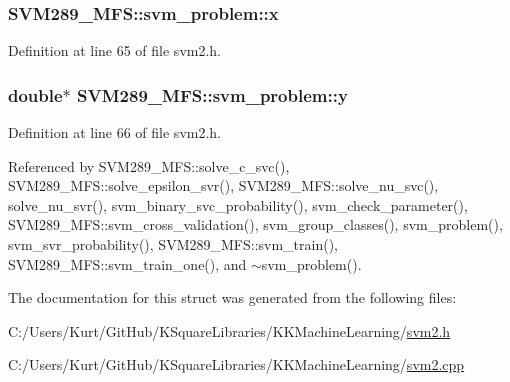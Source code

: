 \subsubsection[{\texorpdfstring{x}{x}}]{ S\+V\+M289\+\_\+\+M\+F\+S\+::svm\+\_\+problem\+::x}\hypertarget{struct_s_v_m289___m_f_s_1_1svm__problem_a7bca932b51ca89f6820225e8e9c1bd35}{}\label{struct_s_v_m289___m_f_s_1_1svm__problem_a7bca932b51ca89f6820225e8e9c1bd35}


Definition at line 65 of file svm2.\+h.

\subsubsection[{\texorpdfstring{y}{y}}]{\setlength{\rightskip}{0pt plus 5cm}double$\ast$ S\+V\+M289\+\_\+\+M\+F\+S\+::svm\+\_\+problem\+::y}\hypertarget{struct_s_v_m289___m_f_s_1_1svm__problem_a56cf75f3e15322e1928a8294f9a55d2a}{}\label{struct_s_v_m289___m_f_s_1_1svm__problem_a56cf75f3e15322e1928a8294f9a55d2a}


Definition at line 66 of file svm2.\+h.



Referenced by S\+V\+M289\+\_\+\+M\+F\+S\+::solve\+\_\+c\+\_\+svc(), S\+V\+M289\+\_\+\+M\+F\+S\+::solve\+\_\+epsilon\+\_\+svr(), S\+V\+M289\+\_\+\+M\+F\+S\+::solve\+\_\+nu\+\_\+svc(), solve\+\_\+nu\+\_\+svr(), svm\+\_\+binary\+\_\+svc\+\_\+probability(), svm\+\_\+check\+\_\+parameter(), S\+V\+M289\+\_\+\+M\+F\+S\+::svm\+\_\+cross\+\_\+validation(), svm\+\_\+group\+\_\+classes(), svm\+\_\+problem(), svm\+\_\+svr\+\_\+probability(), S\+V\+M289\+\_\+\+M\+F\+S\+::svm\+\_\+train(), S\+V\+M289\+\_\+\+M\+F\+S\+::svm\+\_\+train\+\_\+one(), and $\sim$svm\+\_\+problem().



The documentation for this struct was generated from the following files\+:\begin{DoxyCompactItemize}
\item 
C\+:/\+Users/\+Kurt/\+Git\+Hub/\+K\+Square\+Libraries/\+K\+K\+Machine\+Learning/\hyperlink{svm2_8h}{svm2.\+h}\item 
C\+:/\+Users/\+Kurt/\+Git\+Hub/\+K\+Square\+Libraries/\+K\+K\+Machine\+Learning/\hyperlink{svm2_8cpp}{svm2.\+cpp}\end{DoxyCompactItemize}
